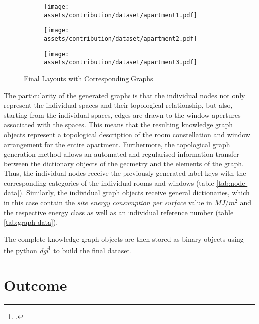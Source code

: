 \documentclass[a4paper, 12pt]{report}
\begin{document}
\begin{figure}
\centering
\begin{subfigure}[][][c]{.33\textwidth}
\centering
\texttt{[image: assets/contribution/dataset/apartment1.pdf]}
\label{fig:apartment-1}
\end{subfigure}%
\begin{subfigure}[][][c]{.33\textwidth}
\centering
\texttt{[image: assets/contribution/dataset/apartment2.pdf]}
\label{fig:apartment-2}
\end{subfigure}%
\begin{subfigure}[][][c]{.33\textwidth}
\centering
\texttt{[image: assets/contribution/dataset/apartment3.pdf]}
\label{fig:apartment-3}
\end{subfigure}
\caption{Final Layouts with Corresponding Graphs}
\label{fig:final-layouts-with-corresponding-graphs}
\end{figure}

The particularity of the generated graphs is that the individual nodes not only represent the individual spaces and their topological relationship, but also, starting from the individual spaces, edges are drawn to the window \glspl{aperture} associated with the spaces. This means that the resulting \gls{knowledge graph} objects represent a topological description of the room constellation and window arrangement for the entire apartment. Furthermore, the topological graph generation method allows an automated and regularised information transfer between the \gls{dictionary} objects of the geometry and the elements of the graph. Thus, the individual nodes receive the previously generated label keys with the corresponding categories of the individual rooms and windows (table \ref{tab:node-data}). Similarly, the individual graph objects receive general dictionaries, which in this case contain the \textit{\gls{site energy consumption} per surface} value in $MJ/m^2$ and the respective energy class as well as an individual reference number (table \ref{tab:graph-data}).

The complete \gls{knowledge graph} objects are then stored as binary objects using the \Gls{python} \textit{\acrfull{dgl}}\footcite{wang2019dgl} to build the final dataset.

\section{Outcome}\label{sec:outcome-synthetic-data-generation}
\end{document}
